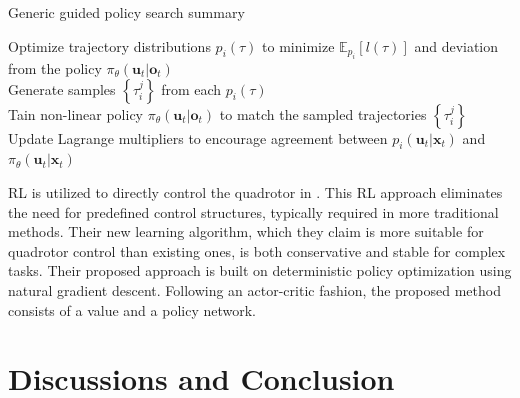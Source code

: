 \documentclass{article}
\newcommand{\B}[1]{\mathbf{#1}}
\begin{document}
\begin{algorithm}[h]
  \caption{Generic guided policy search summary}
  \label{algo:general_gps}
  {
    Optimize trajectory distributions $p_i(\tau)$ to minimize 
    $\mathbb{E}_{p_i}\left[l(\tau)\right]$ and deviation from 
    the policy $\pi_\theta(\B{u}_t | \B{o}_t)$ \\
    Generate samples $\left\{ \tau_i^j \right\}$ from each $p_i(\tau)$ \\
    Tain non-linear policy $\pi_\theta(\B{u}_t | \B{o}_t)$ to
    match the sampled trajectories $\left\{ \tau_i^j \right\}$ \\
    Update Lagrange multipliers to encourage agreement between
    $p_i(\B{u}_t | \B{x}_t)$ and $\pi_\theta(\B{u}_t | \B{x}_t)$
  }
\end{algorithm}



RL is utilized to directly control the quadrotor in \textcite{hwangbo2017control}.
This RL approach eliminates the need for predefined control structures, typically required in more traditional methods. 
Their new learning algorithm, which they claim is more suitable for quadrotor control than existing ones, is both conservative and stable for complex tasks. 
Their proposed approach is built on deterministic policy optimization using natural gradient descent.
Following an actor-critic fashion, the proposed method consists of a value and a policy network.

\section{Discussions and Conclusion}

\printbibliography
\end{document}
